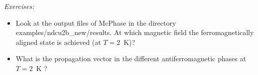 \vspace{1cm}
{\em Exercises:}
\begin{itemize}
\item Look at the output files of {\prg McPhase}  in the directory
{\prg examples/ndcu2b\_new/results}.  At which magnetic field
the ferromagnetically aligned state is achieved (at $T=$2~K)?
\item
What is the propagation vector in the different antiferromagnetic phases at $T=$2~K ?
\end{itemize}

